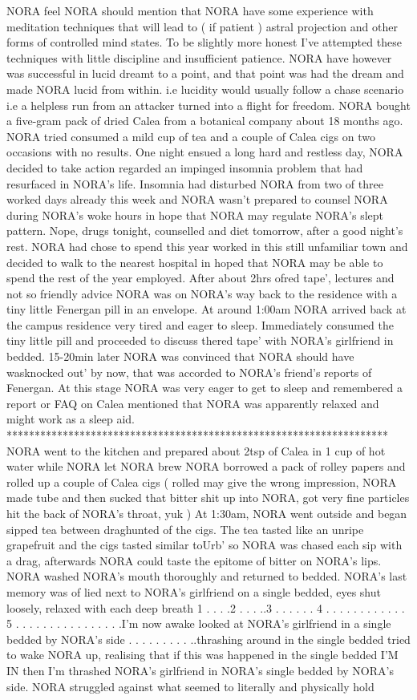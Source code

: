 \documentclass[12pt]{book}
\begin{document}
NORA feel NORA should mention that NORA have some experience with meditation techniques that will lead to ( if patient ) astral projection and other forms of controlled mind states. To be slightly more honest I've attempted these techniques with little discipline and insufficient patience. NORA have however was successful in lucid dreamt to a point, and that point was had the dream and made NORA lucid from within. i.e lucidity would usually follow a chase scenario i.e a helpless run from an attacker turned into a flight for freedom. NORA bought a five-gram pack of dried Calea from a botanical company about 18 months ago. NORA tried consumed a mild cup of tea and a couple of Calea cigs on two occasions with no results. One night ensued a long hard and restless day, NORA decided to take action regarded an impinged insomnia problem that had resurfaced in NORA's life. Insomnia had disturbed NORA from two of three worked days already this week and NORA wasn't prepared to counsel NORA during NORA's woke hours in hope that NORA may regulate NORA's slept pattern. Nope, drugs tonight, counselled and diet tomorrow, after a good night's rest. NORA had chose to spend this year worked in this still unfamiliar town and decided to walk to the nearest hospital in hoped that NORA may be able to spend the rest of the year employed. After about 2hrs ofred tape', lectures and not so friendly advice NORA was on NORA's way back to the residence with a tiny little Fenergan pill in an envelope. At around 1:00am NORA arrived back at the campus residence very tired and eager to sleep. Immediately consumed the tiny little pill and proceeded to discuss thered tape' with NORA's girlfriend in bedded. 15-20min later NORA was convinced that NORA should have wasknocked out' by now, that was accorded to NORA's friend's reports of Fenergan. At this stage NORA was very eager to get to sleep and remembered a report or FAQ on Calea mentioned that NORA was apparently relaxed and might work as a sleep aid. ******************************************************************** NORA went to the kitchen and prepared about 2tsp of Calea in 1 cup of hot water while NORA let NORA brew NORA borrowed a pack of rolley papers and rolled up a couple of Calea cigs ( rolled may give the wrong impression, NORA made tube and then sucked that bitter shit up into NORA, got very fine particles hit the back of NORA's throat, yuk ) At 1:30am, NORA went outside and began sipped tea between draghunted of the cigs. The tea tasted like an unripe grapefruit and the cigs tasted similar toUrb' so NORA was chased each sip with a drag, afterwards NORA could taste the epitome of bitter on NORA's lips. NORA washed NORA's mouth thoroughly and returned to bedded. NORA's last memory was of lied next to NORA's girlfriend on a single bedded, eyes shut loosely, relaxed with each deep breath 1 . . . .2 . . . ..3 . . .  . . . 4 . . .  . . .  . . .  . . . 5 . . .  . . .  . . .  . . .  . . . .I'm now awake looked at NORA's girlfriend in a single bedded by NORA's side . . .  . . .  . . . ..thrashing around in the single bedded tried to wake NORA up, realising that if this was happened in the single bedded I'M IN then I'm thrashed NORA's girlfriend in NORA's single bedded by NORA's side. NORA struggled against what seemed to literally and physically hold 
\end{document}
